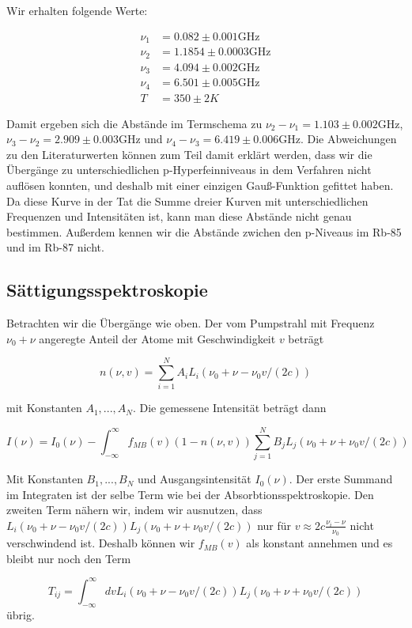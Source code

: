 \documentclass[a4paper,parskip]{scrartcl}
\begin{document}
Wir erhalten folgende Werte:

\begin{align*}
\nu_1 &= 0.082 \pm 0.001 \mathrm{GHz} \\
\nu_2 &= 1.1854 \pm 0.0003 \mathrm{GHz}\\
\nu_3 &= 4.094 \pm 0.002 \mathrm{GHz}\\
\nu_4 &= 6.501 \pm 0.005 \mathrm{GHz}\\
T&=350 \pm 2 K
\end{align*}

Damit ergeben sich die Abstände im Termschema zu $\nu_2 - \nu_1 = 1.103 \pm 0.002$GHz,  $\nu_3 - \nu_2 = 2.909 \pm 0.003$GHz und $\nu_4 - \nu_3 = 6.419 \pm 0.006$GHz. Die Abweichungen zu den Literaturwerten können zum Teil damit erklärt werden, dass wir die Übergänge zu unterschiedlichen p-Hyperfeinniveaus in dem Verfahren nicht auflösen konnten, und deshalb mit einer einzigen Gauß-Funktion gefittet haben. Da diese Kurve in der Tat die Summe dreier Kurven mit unterschiedlichen Frequenzen und Intensitäten ist, kann man diese Abstände nicht genau bestimmen. Außerdem kennen wir die Abstände zwichen den p-Niveaus im Rb-85 und im Rb-87 nicht.

\subsection{Sättigungsspektroskopie}

Betrachten wir die Übergänge wie oben. Der vom Pumpstrahl mit Frequenz $\nu_0+\nu$ angeregte Anteil der Atome mit Geschwindigkeit $v$ beträgt

$$n(\nu, v) = \sum_{i=1}^N A_i L_i(\nu_0+\nu-\nu_0 v/(2c))$$

mit Konstanten $A_1, ..., A_N$. Die gemessene Intensität beträgt dann

$$I(\nu) = I_0(\nu)-\int_{-\infty}^{\infty} f_{MB}(v)(1-n(\nu, v))\sum_{j=1}^N B_j L_j(\nu_0+\nu+\nu_0 v/(2c))$$

Mit Konstanten $B_1, ..., B_N$ und Ausgangsintensität $I_0(\nu)$. Der erste Summand im Integraten ist der selbe Term wie bei der Absorbtionsspektroskopie. Den zweiten Term nähern wir, indem wir ausnutzen, dass  $L_i(\nu_0+\nu-\nu_0 v/(2c)) L_j(\nu_0+\nu+\nu_0 v/(2c))$ nur für $v \approx 2c \frac{\nu_i-\nu}{\nu_0}$ nicht verschwindend ist. Deshalb können wir $f_{MB}(v)$ als konstant annehmen und es bleibt nur noch den Term

$$T_{ij}=\int_{-\infty}^\infty dv L_i(\nu_0+\nu-\nu_0 v/(2c)) L_j(\nu_0+\nu+\nu_0 v/(2c))$$
übrig.
\end{document}
